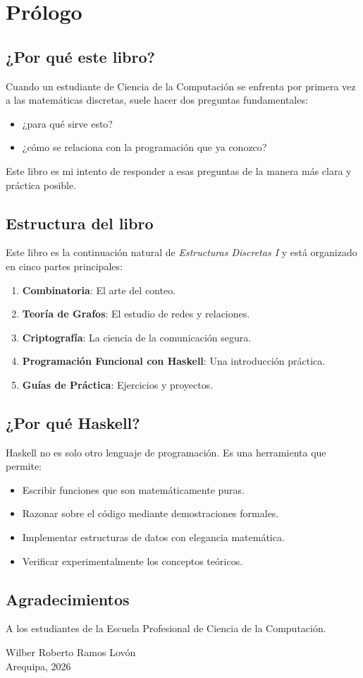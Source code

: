 \chapter*{Prólogo}

\section*{¿Por qué este libro?}
Cuando un estudiante de Ciencia de la Computación se enfrenta por primera vez a las matemáticas discretas, suele hacer dos preguntas fundamentales:
\begin{itemize}
  \item ¿para qué sirve esto?
  \item ¿cómo se relaciona con la programación que ya conozco?
\end{itemize}
Este libro es mi intento de responder a esas preguntas de la manera más clara y práctica posible.

\section*{Estructura del libro}
Este libro es la continuación natural de \emph{Estructuras Discretas I} y está organizado en cinco partes principales:
\begin{enumerate}
  \item \textbf{Combinatoria}: El arte del conteo.
  \item \textbf{Teoría de Grafos}: El estudio de redes y relaciones.
  \item \textbf{Criptografía}: La ciencia de la comunicación segura.
  \item \textbf{Programación Funcional con Haskell}: Una introducción práctica.
  \item \textbf{Guías de Práctica}: Ejercicios y proyectos.
\end{enumerate}

\section*{¿Por qué Haskell?}
Haskell no es solo otro lenguaje de programación. Es una herramienta que permite:
\begin{itemize}
  \item Escribir funciones que son matemáticamente puras.
  \item Razonar sobre el código mediante demostraciones formales.
  \item Implementar estructuras de datos con elegancia matemática.
  \item Verificar experimentalmente los conceptos teóricos.
\end{itemize}

\section*{Agradecimientos}
A los estudiantes de la Escuela Profesional de Ciencia de la Computación.

\vspace{1cm}
\begin{flushright}
Wilber Roberto Ramos Lovón\\
Arequipa, 2026
\end{flushright}